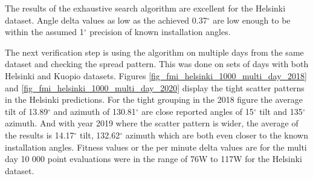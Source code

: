 

\newpage
\noindent The results of the exhaustive search algorithm are excellent for the Helsinki dataset. Angle delta values as low as the achieved 0.37$^\circ$ are low enough to be within the assumed 1$^\circ$ precision of known installation angles. 

The next verification step is using the algorithm on multiple days from the same dataset and checking the spread pattern. This was done on sets of days with both Helsinki and Kuopio datasets. Figures \ref{fig_fmi_helsinki_1000_multi_day_2018} and \ref{fig_fmi_helsinki_1000_multi_day_2020} display the tight scatter patterns in the Helsinki predictions. For the tight grouping in the 2018 figure the average tilt of 13.89$^\circ$ and azimuth of 130.81$^\circ$ are close reported angles of 15$^\circ$ tilt and 135$^\circ$ azimuth. And with year 2019 where the scatter pattern is wider, the average of the results is 14.17$^\circ$ tilt, 132.62$^\circ$ azimuth which are both even closer to the known installation angles. Fitness values or the per minute delta values are for the multi day 10 000 point evaluations were in the range of 76W to 117W for the Helsinki dataset.






